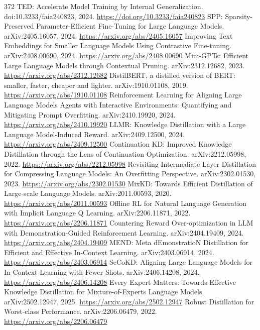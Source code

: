 \documentclass[11pt]{article}
\begin{document}
\begin{thebibliography}{372}
 TED: Accelerate Model Training by Internal Generalization. doi:10.3233/faia240823, 2024. \url{https://doi.org/10.3233/faia240823}
 SPP: Sparsity-Preserved Parameter-Efficient Fine-Tuning for Large Language Models. arXiv:2405.16057, 2024. \url{https://arxiv.org/abs/2405.16057}
 Improving Text Embeddings for Smaller Language Models Using Contrastive Fine-tuning. arXiv:2408.00690, 2024. \url{https://arxiv.org/abs/2408.00690}
 Mini-GPTs: Efficient Large Language Models through Contextual Pruning. arXiv:2312.12682, 2023. \url{https://arxiv.org/abs/2312.12682}
 DistilBERT, a distilled version of BERT: smaller, faster, cheaper and lighter. arXiv:1910.01108, 2019. \url{https://arxiv.org/abs/1910.01108}
 Reinforcement Learning for Aligning Large Language Models Agents with Interactive Environments: Quantifying and Mitigating Prompt Overfitting. arXiv:2410.19920, 2024. \url{https://arxiv.org/abs/2410.19920}
 LLMR: Knowledge Distillation with a Large Language Model-Induced Reward. arXiv:2409.12500, 2024. \url{https://arxiv.org/abs/2409.12500}
 Continuation KD: Improved Knowledge Distillation through the Lens of Continuation Optimization. arXiv:2212.05998, 2022. \url{https://arxiv.org/abs/2212.05998}
 Revisiting Intermediate Layer Distillation for Compressing Language Models: An Overfitting Perspective. arXiv:2302.01530, 2023. \url{https://arxiv.org/abs/2302.01530}
 MixKD: Towards Efficient Distillation of Large-scale Language Models. arXiv:2011.00593, 2020. \url{https://arxiv.org/abs/2011.00593}
 Offline RL for Natural Language Generation with Implicit Language Q Learning. arXiv:2206.11871, 2022. \url{https://arxiv.org/abs/2206.11871}
 Countering Reward Over-optimization in LLM with Demonstration-Guided Reinforcement Learning. arXiv:2404.19409, 2024. \url{https://arxiv.org/abs/2404.19409}
 MEND: Meta dEmonstratioN Distillation for Efficient and Effective In-Context Learning. arXiv:2403.06914, 2024. \url{https://arxiv.org/abs/2403.06914}
 SeCoKD: Aligning Large Language Models for In-Context Learning with Fewer Shots. arXiv:2406.14208, 2024. \url{https://arxiv.org/abs/2406.14208}
 Every Expert Matters: Towards Effective Knowledge Distillation for Mixture-of-Experts Language Models. arXiv:2502.12947, 2025. \url{https://arxiv.org/abs/2502.12947}
 Robust Distillation for Worst-class Performance. arXiv:2206.06479, 2022. \url{https://arxiv.org/abs/2206.06479}

\end{thebibliography}
\end{document}
